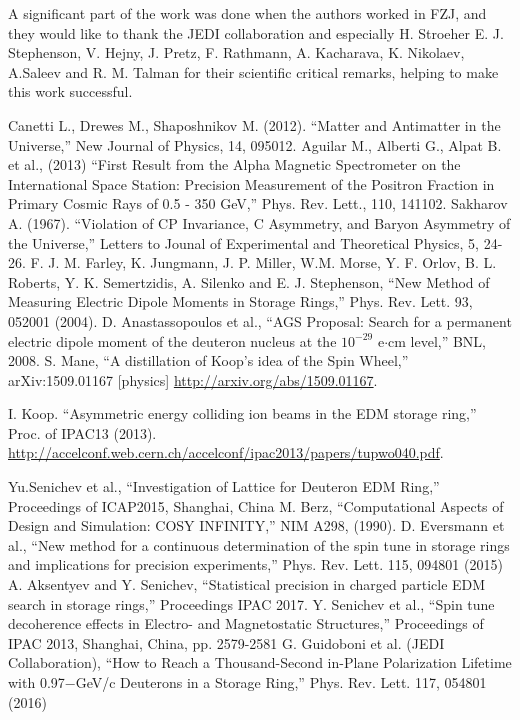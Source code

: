 \documentclass[a4paper]{jacow}
\begin{document}
A significant part of the work was done when the authors worked in FZJ, and they would like to thank the JEDI collaboration and especially H. Stroeher E. J. Stephenson, V. Hejny, J. Pretz, F. Rathmann, A. Kacharava, K. Nikolaev,  A.Saleev and R. M. Talman for their scientific critical remarks, helping to make this work successful.

\begin{thebibliography}{9}
  Canetti L., Drewes M., Shaposhnikov M. (2012). ``Matter and Antimatter in the Universe,'' New Journal of Physics, 14, 095012.
  Aguilar M., Alberti G., Alpat B. et al., (2013) ``First Result from the Alpha Magnetic Spectrometer on the International Space Station: Precision Measurement of the Positron Fraction in Primary Cosmic Rays of 0.5 - 350 GeV,'' Phys. Rev. Lett., 110, 141102.
  Sakharov A. (1967). ``Violation of CP Invariance, C Asymmetry, and Baryon Asymmetry of the Universe,'' Letters to Jounal of Experimental and Theoretical Physics, 5, 24- 26.
  F. J. M. Farley, K. Jungmann, J. P. Miller, W.M. Morse, Y. F. Orlov, B. L. Roberts, Y. K. Semertzidis, A. Silenko  and E. J. Stephenson, ``New Method of Measuring Electric Dipole Moments in Storage Rings,'' Phys. Rev. Lett. 93, 052001 (2004).
  D. Anastassopoulos et al., ``AGS Proposal: Search for a permanent electric dipole moment of the deuteron nucleus at the $10^{-29}$ e$\cdot$cm level,'' BNL, 2008.
  S. Mane, ``A distillation of Koop's idea of the Spin Wheel,'' arXiv:1509.01167 [physics]
  \url{http://arxiv.org/abs/1509.01167}.

  I. Koop. ``Asymmetric energy colliding ion beams in the EDM storage ring,'' Proc. of IPAC13 (2013).
  \url{http://accelconf.web.cern.ch/accelconf/ipac2013/papers/tupwo040.pdf}.

  
  Yu.Senichev et al., ``Investigation of Lattice for Deuteron EDM Ring,'' Proceedings of ICAP2015, Shanghai, China
  M. Berz, ``Computational Aspects of Design and Simulation: COSY INFINITY,'' NIM A298, (1990).
  D. Eversmann et al., ``New method for a continuous determination of the spin tune in storage rings and implications for precision experiments,'' Phys. Rev. Lett. 115, 094801 (2015)
  A. Aksentyev and Y. Senichev, ``Statistical precision in charged particle EDM search
  in storage rings,'' Proceedings IPAC 2017.
  Y. Senichev et al., ``Spin tune decoherence effects in Electro- and Magnetostatic Structures,'' Proceedings of IPAC 2013, Shanghai, China, pp. 2579-2581
  G. Guidoboni et al. (JEDI Collaboration), ``How to Reach a Thousand-Second in-Plane Polarization Lifetime with 0.97−GeV/c Deuterons in a Storage Ring,'' Phys. Rev. Lett. 117, 054801 (2016)
\end{thebibliography}
\end{document}
